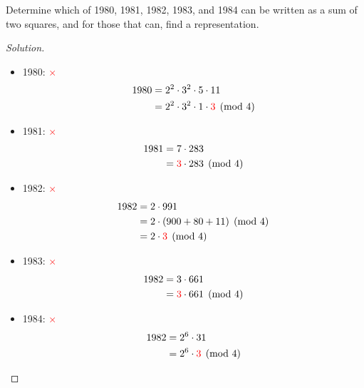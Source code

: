 \documentclass[11pt]{article}
\newenvironment{problem}[2][Problem]{\begin{trivlist}
\item[\hskip \labelsep {\bfseries #1}\hskip \labelsep {\bfseries #2.}]}{\end{trivlist}}
\newenvironment{solution}
  {\renewcommand\qedsymbol{$~$}\begin{proof}[Solution]$ $\par\nobreak\ignorespaces}
  {\end{proof}}
\begin{document}
\begin{problem}{1}
Determine which of 1980, 1981, 1982, 1983, and 1984 can be written as a sum of two squares, and for those that can, find a representation.
\end{problem}

\begin{solution}
  \begin{itemize}
    \item 1980: \textcolor{red}{$\times$}
          \begin{align*}
            1980 & = 2^2 \cdot 3^2 \cdot 5 \cdot 11                          \\
                 & = 2^2 \cdot 3^2 \cdot 1 \cdot \textcolor{red}{3} \pmod{4} \\
          \end{align*}
    \item 1981: \textcolor{red}{$\times$}
          \begin{align*}
            1981 & = 7 \cdot 283                           \\
                 & = \textcolor{red}{3} \cdot 283 \pmod{4} \\
          \end{align*}
    \item 1982: \textcolor{red}{$\times$}
          \begin{align*}
            1982 & = 2 \cdot 991                         \\
                 & = 2 \cdot (900 + 80 + 11) \pmod{4}    \\
                 & = 2 \cdot \textcolor{red}{3} \pmod{4} \\
          \end{align*}
    \item 1983: \textcolor{red}{$\times$}
          \begin{align*}
            1982 & = 3 \cdot 661                           \\
                 & = \textcolor{red}{3} \cdot 661 \pmod{4} \\
          \end{align*}
    \item 1984: \textcolor{red}{$\times$}
          \begin{align*}
            1982 & = 2^6 \cdot 31                          \\
                 & = 2^6 \cdot \textcolor{red}{3} \pmod{4} \\
          \end{align*}
  \end{itemize}
\end{solution}
\end{document}
